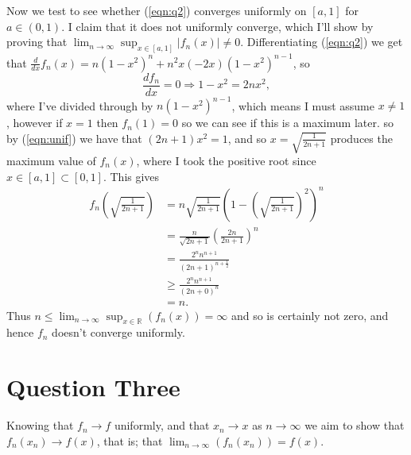 \documentclass{article}
\def \R {\mathbb{R}}
\begin{document}
Now we test to see whether (\ref{eqn:q2}) converges uniformly on $[a,1]$ for $a\in(0,1)$. I claim that it does not uniformly converge,  which I'll show by proving that $\lim_{n\to\infty}\sup_{x\in[a,1]} |f_n(x)|\neq0$. Differentiating (\ref{eqn:q2}) we get that $\frac{d}{dx}f_n(x) = n(1-x^2)^n +n^2x(-2x)(1-x^2)^{n-1}$, so 
	\begin{equation}\label{eqn:unif}
		\frac{df_n}{dx} = 0\Rightarrow 1-x^2 = 2nx^2,
	\end{equation}
where I've divided through by $n(1-x^2)^{n-1}$, which means I must assume $x\neq 1$, however if $x=1$ then $f_n(1)=0$ so we can see if this is a maximum later. so by (\ref{eqn:unif}) we have that $(2n+1)x^2=1$, and so $x=\sqrt{\frac1{2n+1}}$ produces the maximum value of $f_n(x)$, where I took the positive root since $x\in[a,1]\subset[0,1]$. This gives
	\begin{align*}
		f_n\left(\sqrt{\frac{1}{2n+1}}\right)
		&= n\sqrt{\frac{1}{2n+1}}\left(1-\left(\sqrt{\frac{1}{2n+1}}\right)^2\right)^n \\
		&= \frac{n}{\sqrt{2n+1}}\left(\frac{2n}{2n+1}\right)^n \\
		&= \frac{2^nn^{n+1}}{(2n+1)^{n+\frac12}} \\
		&\geq \frac{2^nn^{n+1}}{(2n+0)^n} \\
		&= n.
	\end{align*}
Thus $n\leq\lim_{n\to\infty}\sup_{x\in\R}(f_n(x))=\infty$ and so is certainly not zero, and hence $f_n$ doesn't converge uniformly.


\section*{Question Three}
Knowing that $f_n\to f$ uniformly, and that $x_n\to x$ as $n\to\infty$ we aim to show that $f_n(x_n)\to f(x)$, that is; that $\lim_{n\to\infty}(f_n(x_n)) = f(x)$.
\end{document}
